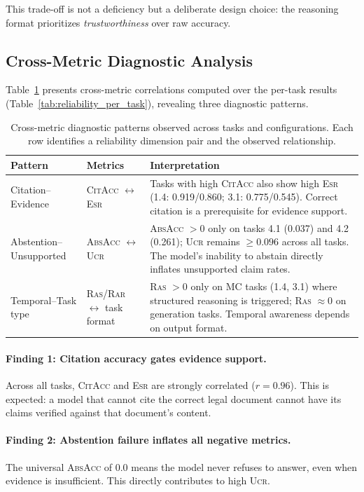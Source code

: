 \documentclass[11pt,a4paper]{article}
\newcommand{\citacc}{\textsc{CitAcc}}
\newcommand{\ras}{\textsc{Ras}}
\newcommand{\rar}{\textsc{Rar}}
\newcommand{\esr}{\textsc{Esr}}
\newcommand{\ucr}{\textsc{Ucr}}
\newcommand{\absacc}{\textsc{AbsAcc}}
\begin{document}
This trade-off is not a deficiency but a deliberate design choice: the reasoning format prioritizes \emph{trustworthiness} over raw accuracy.

\subsection{Cross-Metric Diagnostic Analysis}
\label{sec:diagnostic}

Table~\ref{tab:diagnostic} presents cross-metric correlations computed over the per-task results (Table~\ref{tab:reliability_per_task}), revealing three diagnostic patterns.

\begin{table}[htbp]
\centering
\caption{Cross-metric diagnostic patterns observed across tasks and configurations. Each row identifies a reliability dimension pair and the observed relationship.}
\label{tab:diagnostic}
\begin{tabular}{@{}llp{6cm}@{}}
\toprule
\textbf{Pattern} & \textbf{Metrics} & \textbf{Interpretation} \\
\midrule
Citation--Evidence & \citacc{} $\leftrightarrow$ \esr{} & Tasks with high \citacc{} also show high \esr{} (1.4: 0.919/0.860; 3.1: 0.775/0.545). Correct citation is a prerequisite for evidence support. \\
\midrule
Abstention--Unsupported & \absacc{} $\leftrightarrow$ \ucr{} & \absacc{} $> 0$ only on tasks 4.1 (0.037) and 4.2 (0.261); \ucr{} remains $\geq 0.096$ across all tasks. The model's inability to abstain directly inflates unsupported claim rates. \\
\midrule
Temporal--Task type & \ras/\rar{} $\leftrightarrow$ task format & \ras{} $> 0$ only on MC tasks (1.4, 3.1) where structured reasoning is triggered; \ras{} $\approx 0$ on generation tasks. Temporal awareness depends on output format. \\
\bottomrule
\end{tabular}
\end{table}

\paragraph{Finding 1: Citation accuracy gates evidence support.}
Across all tasks, \citacc{} and \esr{} are strongly correlated ($r = 0.96$).
This is expected: a model that cannot cite the correct legal document cannot have its claims verified against that document's content.

\paragraph{Finding 2: Abstention failure inflates all negative metrics.}
The universal \absacc{} of 0.0 means the model never refuses to answer, even when evidence is insufficient.
This directly contributes to high \ucr{}.
\end{document}
